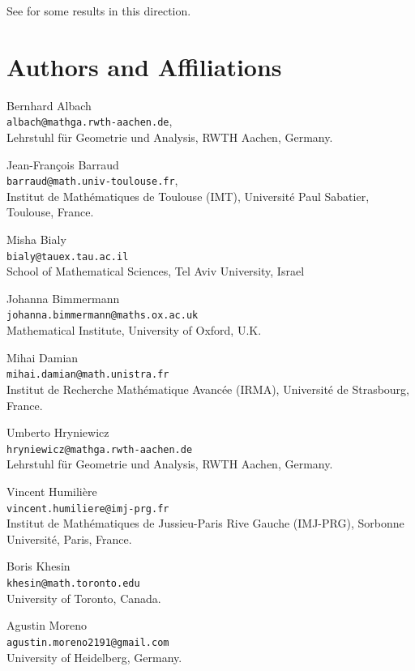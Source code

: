 \documentclass[11pt]{article}
\theoremstyle{definition}
\begin{document}
See \cite{PTT,Pe,Ta20,Gl1} for some results in this direction. 








\section{Authors and Affiliations}

Bernhard Albach\\
\texttt{albach@mathga.rwth-aachen.de},\\
Lehrstuhl f\"ur Geometrie und Analysis, RWTH Aachen, Germany. \bigskip 

Jean-Fran\c{c}ois Barraud\\
\texttt{barraud@math.univ-toulouse.fr},\\
Institut de Mathématiques de Toulouse (IMT), Université Paul Sabatier, Toulouse, France. 
\bigskip 

Misha Bialy\\
\texttt{bialy@tauex.tau.ac.il} \\
School of Mathematical Sciences, Tel Aviv University, Israel \bigskip

Johanna Bimmermann\\
\texttt{johanna.bimmermann@maths.ox.ac.uk} \\
Mathematical Institute, University of Oxford, U.K. 
\bigskip 

Mihai Damian\\
\texttt{mihai.damian@math.unistra.fr} \\
Institut de Recherche Mathématique Avancée (IRMA), Université de Strasbourg, France. \bigskip

Umberto Hryniewicz\\
\texttt{hryniewicz@mathga.rwth-aachen.de} \\
Lehrstuhl f\"ur Geometrie und Analysis, RWTH Aachen, Germany. \bigskip

Vincent Humilière\\
\texttt{vincent.humiliere@imj-prg.fr} \\
Institut de Mathématiques de Jussieu-Paris Rive Gauche (IMJ-PRG), Sorbonne Université, Paris, France. 
\bigskip

Boris Khesin\\
\texttt{khesin@math.toronto.edu}\\
University of Toronto, Canada.
\bigskip 

Agustin Moreno\\
\texttt{agustin.moreno2191@gmail.com} \\
University of Heidelberg, Germany.
\bigskip
\end{document}
